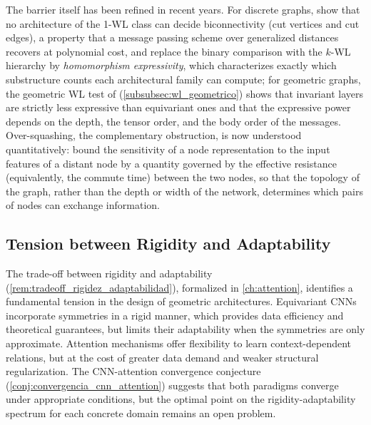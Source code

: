 The barrier itself has been refined in recent years. For discrete graphs, \citet{zhang2023biconnectivity} show that no architecture of the 1-WL class can decide biconnectivity (cut vertices and cut edges), a property that a message passing scheme over generalized distances recovers at polynomial cost, and \citet{zhang2024beyondwl} replace the binary comparison with the $k$-WL hierarchy by \textit{homomorphism expressivity}, which characterizes exactly which substructure counts each architectural family can compute; for geometric graphs, the geometric WL test of \citet{joshi2023expressive} (\autoref{subsubsec:wl_geometrico}) shows that invariant layers are strictly less expressive than equivariant ones and that the expressive power depends on the depth, the tensor order, and the body order of the messages. Over-squashing, the complementary obstruction, is now understood quantitatively: \citet{digiovanni2023oversquashing} bound the sensitivity of a node representation to the input features of a distant node by a quantity governed by the effective resistance (equivalently, the commute time) between the two nodes, so that the topology of the graph, rather than the depth or width of the network, determines which pairs of nodes can exchange information.

\subsection{Tension between Rigidity and Adaptability}

The trade-off between rigidity and adaptability (\autoref{rem:tradeoff_rigidez_adaptabilidad}), formalized in \autoref{ch:attention}, identifies a fundamental tension in the design of geometric architectures. Equivariant \glspl{CNN} incorporate symmetries in a rigid manner, which provides data efficiency and theoretical guarantees, but limits their adaptability when the symmetries are only approximate. Attention mechanisms offer flexibility to learn context-dependent relations, but at the cost of greater data demand and weaker structural regularization. The \gls{CNN}-attention convergence conjecture (\autoref{conj:convergencia_cnn_attention}) suggests that both paradigms converge under appropriate conditions, but the optimal point on the rigidity-adaptability spectrum for each concrete domain remains an open problem.

